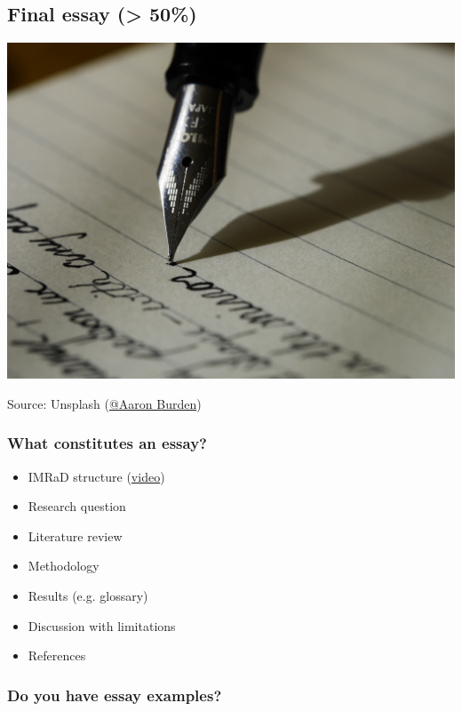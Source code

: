 \documentclass[11pt]{article}
\begin{document}
\subsection*{Final essay (> 50\%)}
\label{sec:orgdc37e26}

\begin{center}
\includegraphics[width=.9\linewidth]{./img/essay.jpg}
\end{center}

Source: Unsplash (\href{https://unsplash.com/photos/y02jEX\_B0O0}{@Aaron Burden})

\subsubsection*{What constitutes an essay?}
\label{sec:org38a063c}

\begin{itemize}
\item IMRaD structure (\href{https://youtu.be/dip7UwZ3wUM}{video})
\item Research question
\item Literature review
\item Methodology
\item Results (e.g. glossary)
\item Discussion with limitations
\item References
\end{itemize}

\subsubsection*{Do you have essay examples?}
\label{sec:org777388b}
\end{document}
